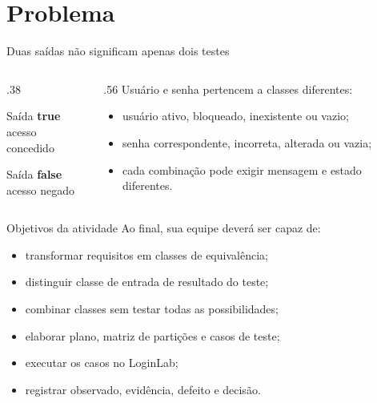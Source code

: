 \section{Problema}

\begin{frame}{Duas saídas não significam apenas dois testes}
  \begin{columns}[T,onlytextwidth]
    \begin{column}{.38\textwidth}
      \begin{block}{Saída}
        \centering
        \textbf{true}\\
        acesso concedido
      \end{block}
      \begin{block}{Saída}
        \centering
        \textbf{false}\\
        acesso negado
      \end{block}
    \end{column}
    \begin{column}{.56\textwidth}
      Usuário e senha pertencem a classes diferentes:
      \begin{itemize}
        \item usuário ativo, bloqueado, inexistente ou vazio;
        \item senha correspondente, incorreta, alterada ou vazia;
        \item cada combinação pode exigir mensagem e estado diferentes.
      \end{itemize}
    \end{column}
  \end{columns}
\end{frame}

\begin{frame}{Objetivos da atividade}
  Ao final, sua equipe deverá ser capaz de:
  \begin{itemize}
    \item transformar requisitos em classes de equivalência;
    \item distinguir classe de entrada de resultado do teste;
    \item combinar classes sem testar todas as possibilidades;
    \item elaborar plano, matriz de partições e casos de teste;
    \item executar os casos no LoginLab;
    \item registrar observado, evidência, defeito e decisão.
  \end{itemize}
\end{frame}

